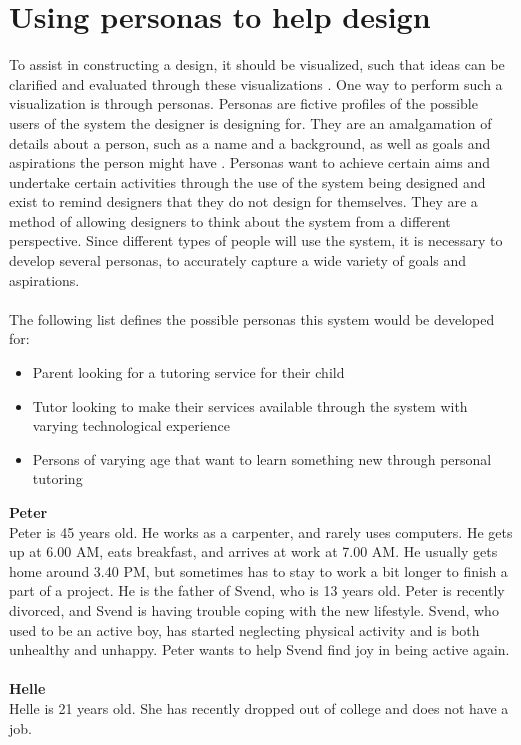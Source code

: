 \section{Using personas to help design}
To assist in constructing a design, it should be visualized, such that ideas can be clarified and evaluated through these visualizations \cite{DEB}.
One way to perform such a visualization is through personas.
Personas are fictive profiles of the possible users of the system the designer is designing for.
They are an amalgamation of details about a person, such as a name and a background, as well as goals and aspirations the person might have \cite{DEB}.
Personas want to achieve certain aims and undertake certain activities through the use of the system being designed and exist to remind designers that they do not design for themselves.
They are a method of allowing designers to think about the system from a different perspective.
Since different types of people will use the system, it is necessary to develop several personas, to accurately capture a wide variety of goals and aspirations.
\\\\
The following list defines the possible personas this system would be developed for:
\begin{itemize}
    \item Parent looking for a tutoring service for their child
    \item Tutor looking to make their services available through the system with varying technological experience
    \item Persons of varying age that want to learn something new through personal tutoring
\end{itemize}
\noindent
\textbf{Peter}
\\
Peter is 45 years old.
He works as a carpenter, and rarely uses computers.
He gets up at 6.00 AM, eats breakfast, and arrives at work at 7.00 AM.
He usually gets home around 3.40 PM, but sometimes has to stay to work a bit longer to finish a part of a project.
He is the father of Svend, who is 13 years old.
Peter is recently divorced, and Svend is having trouble coping with the new lifestyle.
Svend, who used to be an active boy, has started neglecting physical activity and is both unhealthy and unhappy.
Peter wants to help Svend find joy in being active again. 
\\\\
\textbf{Helle}
\\
Helle is 21 years old.
She has recently dropped out of college and does not have a job.
